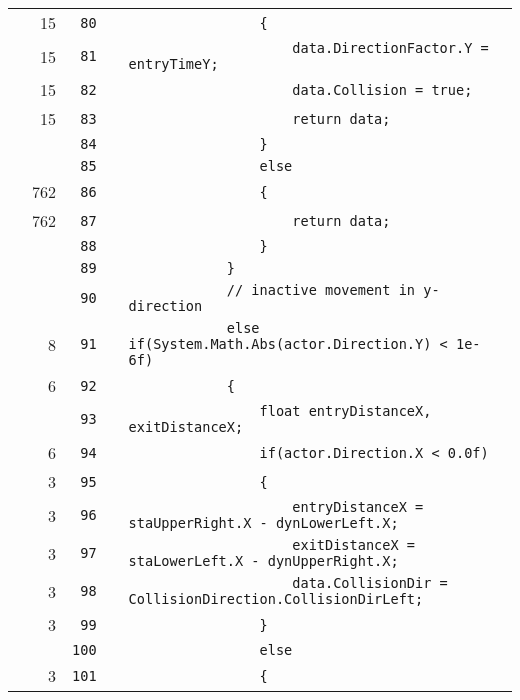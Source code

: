 \documentclass[a4paper,landscape,10pt]{article}
\begin{document}
\begin{longtable}[l]{lrrll}
\cellcolor{green} & 15 & \verb~80~ & & \verb~                {~\\
\cellcolor{green} & 15 & \verb~81~ & & \verb~                    data.DirectionFactor.Y = entryTimeY;~\\
\cellcolor{green} & 15 & \verb~82~ & & \verb~                    data.Collision = true;~\\
\cellcolor{green} & 15 & \verb~83~ & & \verb~                    return data;~\\
\cellcolor{gray} &  & \verb~84~ & & \verb~                }~\\
\cellcolor{gray} &  & \verb~85~ & & \verb~                else~\\
\cellcolor{green} & 762 & \verb~86~ & & \verb~                {~\\
\cellcolor{green} & 762 & \verb~87~ & & \verb~                    return data;~\\
\cellcolor{gray} &  & \verb~88~ & & \verb~                }~\\
\cellcolor{gray} &  & \verb~89~ & & \verb~            }~\\
\cellcolor{gray} &  & \verb~90~ & & \verb~            // inactive movement in y-direction~\\
\cellcolor{green} & 8 & \verb~91~ & & \verb~            else if(System.Math.Abs(actor.Direction.Y) < 1e-6f)~\\
\cellcolor{green} & 6 & \verb~92~ & & \verb~            {~\\
\cellcolor{gray} &  & \verb~93~ & & \verb~                float entryDistanceX, exitDistanceX;~\\
\cellcolor{green} & 6 & \verb~94~ & & \verb~                if(actor.Direction.X < 0.0f)~\\
\cellcolor{green} & 3 & \verb~95~ & & \verb~                {~\\
\cellcolor{green} & 3 & \verb~96~ & & \verb~                    entryDistanceX = staUpperRight.X - dynLowerLeft.X;~\\
\cellcolor{green} & 3 & \verb~97~ & & \verb~                    exitDistanceX = staLowerLeft.X - dynUpperRight.X;~\\
\cellcolor{green} & 3 & \verb~98~ & & \verb~                    data.CollisionDir = CollisionDirection.CollisionDirLeft;~\\
\cellcolor{green} & 3 & \verb~99~ & & \verb~                }~\\
\cellcolor{gray} &  & \verb~100~ & & \verb~                else~\\
\cellcolor{green} & 3 & \verb~101~ & & \verb~                {~\\

\end{longtable}
\end{document}
